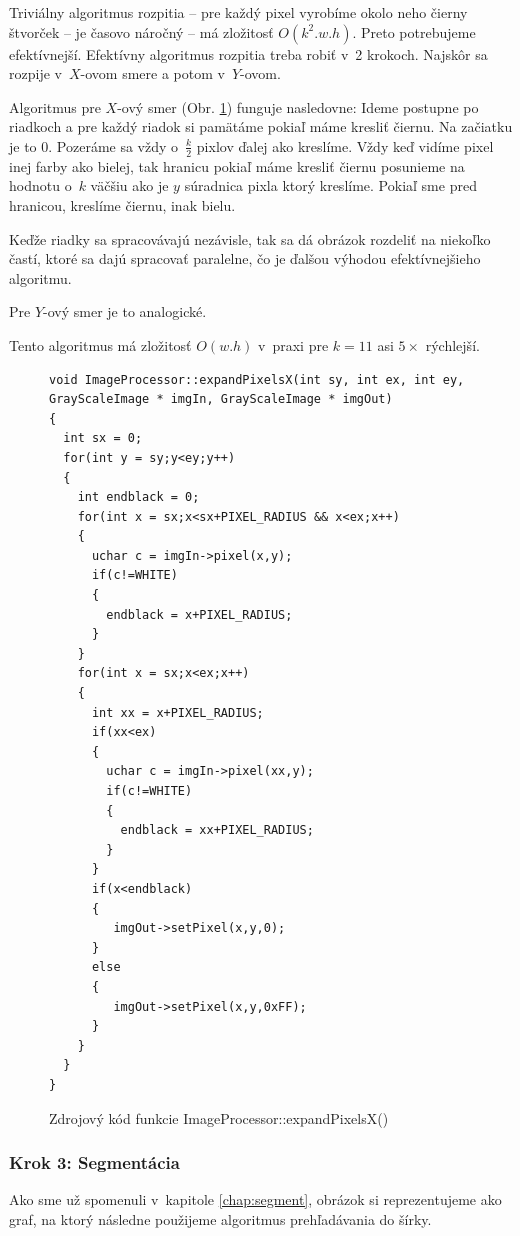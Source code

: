 Triviálny algoritmus rozpitia -- pre každý pixel vyrobíme okolo neho čierny štvorček -- je časovo náročný -- má zložitosť $O(k^2.w.h)$. Preto potrebujeme efektívnejší. 
Efektívny algoritmus rozpitia treba robiť v~2 krokoch. Najskôr sa rozpije v~$X$-ovom smere a potom v~$Y$-ovom.

Algoritmus pre $X$-ový smer (Obr. \ref{fig:expandPixelsX}) funguje nasledovne: Ideme postupne po riadkoch a pre každý riadok si pamätáme pokiaľ máme kresliť čiernu.
Na začiatku je to 0. Pozeráme sa vždy o~$\frac{k}{2}$ pixlov ďalej ako kreslíme.
Vždy keď vidíme pixel inej farby ako bielej, tak hranicu pokiaľ máme kresliť čiernu posunieme na hodnotu o~$k$ väčšiu ako je $y$ súradnica pixla ktorý kreslíme. Pokiaľ sme pred hranicou, kreslíme čiernu, inak bielu. 

Keďže riadky sa spracovávajú nezávisle, tak sa dá obrázok rozdeliť na niekoľko častí, ktoré sa dajú spracovať paralelne, čo je ďalšou výhodou efektívnejšieho algoritmu.

Pre $Y$-ový smer je to analogické. 

Tento algoritmus má zložitosť $O(w.h)$ v~praxi pre $k=11$ asi $5\times$ rýchlejší.  
\begin{figure}[htp]
\begin{lstlisting}
void ImageProcessor::expandPixelsX(int sy, int ex, int ey, GrayScaleImage * imgIn, GrayScaleImage * imgOut)
{
  int sx = 0;
  for(int y = sy;y<ey;y++)
  {
    int endblack = 0;
    for(int x = sx;x<sx+PIXEL_RADIUS && x<ex;x++)
    {
      uchar c = imgIn->pixel(x,y);
      if(c!=WHITE)
      {
        endblack = x+PIXEL_RADIUS;
      }
    }
    for(int x = sx;x<ex;x++)
    {
      int xx = x+PIXEL_RADIUS;
      if(xx<ex)
      {
        uchar c = imgIn->pixel(xx,y);
        if(c!=WHITE)
        {
          endblack = xx+PIXEL_RADIUS;
        }
      }
      if(x<endblack)
      {
         imgOut->setPixel(x,y,0);
      }
      else
      {
         imgOut->setPixel(x,y,0xFF);
      }
    }
  }
}
\end{lstlisting}
\caption{Zdrojový kód funkcie ImageProcessor::expandPixelsX()}
\label{fig:expandPixelsX}
\end{figure}

\subsubsection{Krok 3: Segmentácia}
Ako sme už spomenuli v~kapitole \ref{chap:segment}, obrázok si reprezentujeme ako graf, na ktorý následne použijeme algoritmus prehľadávania do šírky.

